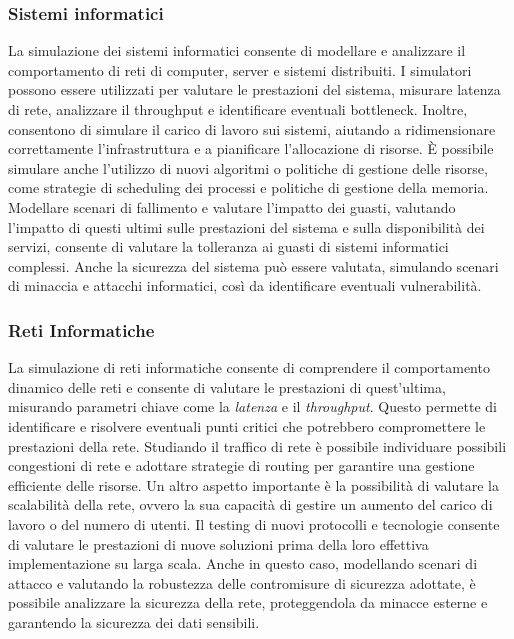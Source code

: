 \documentclass[12pt,a4paper,openright,twoside]{book}
\begin{document}
\subsubsection{Sistemi informatici}
La simulazione dei sistemi informatici consente di modellare e analizzare il comportamento di reti di computer, server e sistemi distribuiti. 
I simulatori possono essere utilizzati per valutare le prestazioni del sistema, misurare latenza di rete, analizzare il throughput e identificare eventuali bottleneck. Inoltre, consentono di simulare il carico di lavoro sui sistemi, aiutando a ridimensionare correttamente l'infrastruttura e a pianificare l'allocazione di risorse. 
È possibile simulare anche l'utilizzo di nuovi algoritmi o politiche di gestione delle risorse, come strategie di scheduling dei processi e politiche di gestione della memoria.
Modellare scenari di fallimento e valutare l'impatto dei guasti, valutando l'impatto di questi ultimi sulle prestazioni del sistema e sulla disponibilità dei servizi, consente di valutare la tolleranza ai guasti di sistemi informatici complessi. 
Anche la sicurezza del sistema può essere valutata, simulando scenari di minaccia e attacchi informatici, così da identificare eventuali vulnerabilità.

\subsubsection{Reti Informatiche}
La simulazione di reti informatiche consente di comprendere il comportamento dinamico delle reti e consente di valutare le prestazioni di quest'ultima, misurando parametri chiave come la \textit{latenza} e il \textit{throughput}. Questo permette di identificare e risolvere eventuali punti critici che potrebbero compromettere le prestazioni della rete. 
Studiando il traffico di rete è possibile individuare possibili congestioni di rete e adottare strategie di routing per garantire una gestione efficiente delle risorse. 
Un altro aspetto importante è la possibilità di valutare la scalabilità della rete, ovvero la sua capacità di gestire un aumento del carico di lavoro o del numero di utenti. 
Il testing di nuovi protocolli e tecnologie consente di valutare le prestazioni di nuove soluzioni prima della loro effettiva implementazione su larga scala. 
Anche in questo caso, modellando scenari di attacco e valutando la robustezza delle contromisure di sicurezza adottate, è possibile analizzare la sicurezza della rete, proteggendola da minacce esterne e garantendo la sicurezza dei dati sensibili. 
\end{document}
